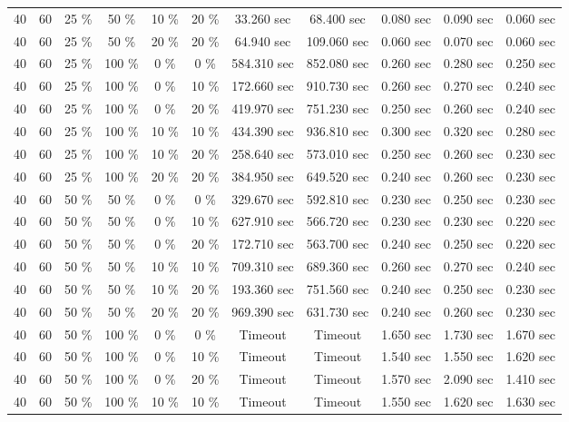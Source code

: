 \documentclass{article}
\begin{document}
\begin{longtable}[]{@{}ccccccccccc@{}}
40 & 60 & 25 \% & 50 \% & 10 \% & 20 \% & 33.260 sec & 68.400 sec & 0.080 sec & 0.090 sec & 0.060 sec \\
40 & 60 & 25 \% & 50 \% & 20 \% & 20 \% & 64.940 sec & 109.060 sec & 0.060 sec & 0.070 sec & 0.060 sec \\
40 & 60 & 25 \% & 100 \% & 0 \% & 0 \% & 584.310 sec & 852.080 sec & 0.260 sec & 0.280 sec & 0.250 sec \\
40 & 60 & 25 \% & 100 \% & 0 \% & 10 \% & 172.660 sec & 910.730 sec & 0.260 sec & 0.270 sec & 0.240 sec \\
40 & 60 & 25 \% & 100 \% & 0 \% & 20 \% & 419.970 sec & 751.230 sec & 0.250 sec & 0.260 sec & 0.240 sec \\
40 & 60 & 25 \% & 100 \% & 10 \% & 10 \% & 434.390 sec & 936.810 sec & 0.300 sec & 0.320 sec & 0.280 sec \\
40 & 60 & 25 \% & 100 \% & 10 \% & 20 \% & 258.640 sec & 573.010 sec & 0.250 sec & 0.260 sec & 0.230 sec \\
40 & 60 & 25 \% & 100 \% & 20 \% & 20 \% & 384.950 sec & 649.520 sec & 0.240 sec & 0.260 sec & 0.230 sec \\
40 & 60 & 50 \% & 50 \% & 0 \% & 0 \% & 329.670 sec & 592.810 sec & 0.230 sec & 0.250 sec & 0.230 sec \\
40 & 60 & 50 \% & 50 \% & 0 \% & 10 \% & 627.910 sec & 566.720 sec & 0.230 sec & 0.230 sec & 0.220 sec \\
40 & 60 & 50 \% & 50 \% & 0 \% & 20 \% & 172.710 sec & 563.700 sec & 0.240 sec & 0.250 sec & 0.220 sec \\
40 & 60 & 50 \% & 50 \% & 10 \% & 10 \% & 709.310 sec & 689.360 sec & 0.260 sec & 0.270 sec & 0.240 sec \\
40 & 60 & 50 \% & 50 \% & 10 \% & 20 \% & 193.360 sec & 751.560 sec & 0.240 sec & 0.250 sec & 0.230 sec \\
40 & 60 & 50 \% & 50 \% & 20 \% & 20 \% & 969.390 sec & 631.730 sec & 0.240 sec & 0.260 sec & 0.230 sec \\
40 & 60 & 50 \% & 100 \% & 0 \% & 0 \% & Timeout & Timeout & 1.650 sec & 1.730 sec & 1.670 sec \\
40 & 60 & 50 \% & 100 \% & 0 \% & 10 \% & Timeout & Timeout & 1.540 sec & 1.550 sec & 1.620 sec \\
40 & 60 & 50 \% & 100 \% & 0 \% & 20 \% & Timeout & Timeout & 1.570 sec & 2.090 sec & 1.410 sec \\
40 & 60 & 50 \% & 100 \% & 10 \% & 10 \% & Timeout & Timeout & 1.550 sec & 1.620 sec & 1.630 sec \\

\end{longtable}
\end{document}

